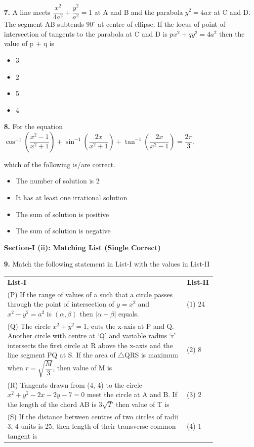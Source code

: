 \documentclass[10pt,twocolumn]{extarticle}
\renewcommand{\arraystretch}{1.15}
\newenvironment{qoptions}{\begin{itemize}[leftmargin=1.8em,itemsep=2pt,topsep=2pt,label={}]}{\end{itemize}}
\newcommand{\opt}[2]{\item[({#1})] {#2}}
\newcommand{\subsectionhdr}[1]{\par\vspace{3pt}\noindent\textbf{#1}\par\vspace{2pt}}
\begin{document}
\textbf{7.} A line meets $\dfrac{x^2}{4a^2}+\dfrac{y^2}{a^2}=1$ at A and B and the parabola $y^2=4ax$ at C and D. The segment AB subtends $90^\circ$ at centre of ellipse. If the locus of point of intersection of tangents to the parabola at C and D is $px^2+qy^2=4a^2$ then the value of p $+$ q is

\begin{qoptions}
\opt{A}{3}
\opt{B}{2}
\opt{C}{5}
\opt{D}{4}
\end{qoptions}

\textbf{8.} For the equation $\cos^{-1}\left(\dfrac{x^2-1}{x^2+1}\right)+\sin^{-1}\left(\dfrac{2x}{x^2+1}\right)+\tan^{-1}\left(\dfrac{2x}{x^2-1}\right)=\dfrac{2\pi}{3}$,

which of the following is/are correct.

\begin{qoptions}
\opt{A}{The number of solution is 2}
\opt{B}{It has at least one irrational solution}
\opt{C}{The sum of solution is positive}
\opt{D}{The sum of solution is negative}
\end{qoptions}

\subsectionhdr{Section-I (ii): Matching List (Single Correct)}

\textbf{9.} Match the following statement in List-I with the values in List-II

\begin{center}
\renewcommand{\arraystretch}{1.4}
\begin{tabular}{@{}p{0.72\linewidth}p{0.12\linewidth}@{}}
\textbf{List-I} & \textbf{List-II}\\
(P) If the range of values of a such that a circle passes through the point of intersection of $y=x^2$ and $x^2-y^2=a^2$ is $(\alpha,\beta)$ then $|\alpha-\beta|$ equals. & (1) 24\\
(Q) The circle $x^2+y^2=1$, cuts the x-axis at P and Q. Another circle with centre at `Q' and variable radius `r' intersects the first circle at R above the x-axis and the line segment PQ at S. If the area of $\triangle$QRS is maximum when $r=\sqrt{\dfrac M3}$, then value of M is & (2) 8\\
(R) Tangents drawn from (4, 4) to the circle $x^2+y^2-2x-2y-7=0$ meet the circle at A and B. If the length of the chord AB is $3\sqrt T$ then value of T is & (3) 2\\
(S) If the distance between centres of two circles of radii 3, 4 units is 25, then length of their transverse common tangent is & (4) 1\\
\end{tabular}
\renewcommand{\arraystretch}{1.15}
\end{center}
\end{document}
